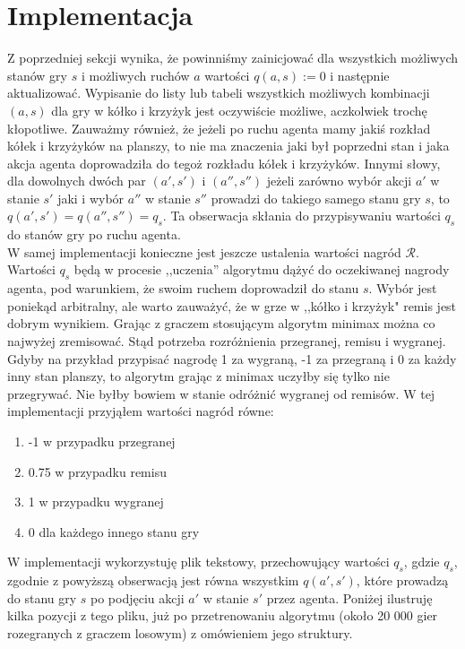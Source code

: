\documentclass[licencjacka]{pracamgr}
\begin{document}
\section{Implementacja}

Z poprzedniej sekcji wynika, że powinniśmy zainicjować dla wszystkich możliwych stanów gry $s$ i możliwych ruchów $a$ wartości $q(a,s):=0$ i następnie aktualizować. Wypisanie do listy lub tabeli wszystkich możliwych kombinacji $(a,s)$ dla gry w kółko i krzyżyk jest oczywiście możliwe, aczkolwiek trochę kłopotliwe. Zauważmy również, że jeżeli po ruchu agenta  mamy jakiś rozkład kółek i krzyżyków na planszy, to nie ma znaczenia jaki był poprzedni stan i jaka akcja agenta doprowadziła do tegoż rozkładu kółek i krzyżyków. Innymi słowy, dla dowolnych dwóch par $(a', s')$ i $(a'', s'')$  jeżeli zarówno wybór akcji $a'$ w stanie $s'$ jaki i wybór $a''$ w stanie $s''$ prowadzi do takiego samego stanu gry $s$,  to $q(a', s') = q(a'', s'') = q_{s}$. Ta obserwacja skłania do przypisywaniu wartości $q_{s}$ do stanów gry po ruchu agenta. \\

W samej implementacji konieczne jest jeszcze ustalenia wartości nagród $\mathcal{R}$.  Wartości $q_{s}$ będą w procesie ,,uczenia''  algorytmu dążyć do oczekiwanej nagrody agenta, pod warunkiem, że swoim ruchem doprowadził do stanu $s$. Wybór jest poniekąd arbitralny, ale warto zauważyć, że w grze w ,,kółko i krzyżyk" remis jest dobrym wynikiem. Grając z graczem stosującym algorytm minimax można co najwyżej zremisować. Stąd potrzeba rozróżnienia przegranej, remisu i wygranej. Gdyby na przykład przypisać nagrodę 1 za wygraną, -1 za przegraną i 0 za każdy inny stan planszy, to algorytm grając z minimax uczyłby się tylko nie przegrywać. Nie byłby bowiem w stanie odróżnić wygranej od remisów. W tej implementacji przyjąłem wartości nagród równe: 
\begin{enumerate}
	\item{-1 w przypadku przegranej}
	\item{0.75 w przypadku remisu }
	\item{1 w przypadku wygranej}
	\item{0 dla każdego innego stanu gry}
\end{enumerate}

W implementacji wykorzystuję plik tekstowy, przechowujący wartości $q_{s}$, gdzie $q_{s}$, zgodnie z powyższą obserwacją jest równa wszystkim  $q(a',s')$, które prowadzą do stanu gry $s$ po podjęciu akcji $a'$ w stanie $s'$ przez agenta. Poniżej ilustruję kilka pozycji z tego pliku, już po przetrenowaniu algorytmu (około 20 000 gier rozegranych z graczem losowym) z omówieniem jego struktury.
\end{document}
